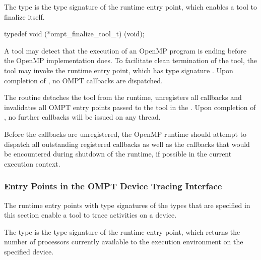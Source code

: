 \label{sec:ompt_finalize_tool_t}
\label{sec:ompt_finalize_tool}

\summary
The  type is the type signature of the 
 runtime entry point, which enables a tool 
to finalize itself.

\format
\begin{ccppspecific}
\begin{omptInquiry}
typedef void (*ompt_finalize_tool_t) (void);
\end{omptInquiry}
\end{ccppspecific}

\descr
A tool may detect that the execution of an OpenMP program is ending 
before the OpenMP implementation does. To facilitate clean termination 
of the tool, the tool may invoke the  runtime 
entry point, which has type signature . Upon 
completion of , no OMPT callbacks are dispatched.

\effect
The  routine detaches the tool from the runtime, 
unregisters all callbacks and invalidates all OMPT entry points passed to 
the tool in the . Upon completion of ,
no further callbacks will be issued on any thread.

Before the callbacks are unregistered, the OpenMP runtime should attempt
to dispatch all outstanding registered callbacks as well as the callbacks 
that would be encountered during shutdown of the runtime, if possible in 
the current execution context.



\subsubsection{Entry Points in the OMPT Device Tracing Interface}
\label{sec:ompt-tracing-entry-points}

The runtime entry points with type signatures of the types that are 
specified in this section enable a tool to trace activities on a device.



\label{sec:ompt_get_device_num_procs_t}

\summary
The  type is the type signature of the 
 runtime entry point, which returns the 
number of processors currently available to the execution environment on 
the specified device.

